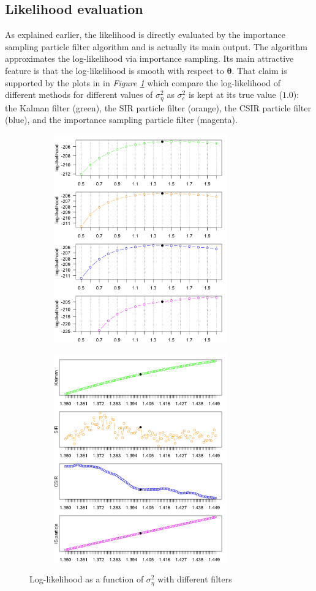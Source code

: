 \documentclass[11pt, oneside]{scrreprt}   	%
\begin{document}
\subsection{Likelihood evaluation}
As explained earlier, the likelihood is directly evaluated by the importance sampling particle filter algorithm and is actually its main output. 
The algorithm approximates the log-likelihood via importance sampling. 
Its main attractive feature is that the log-likelihood is smooth with respect to $\boldsymbol{\theta}$. 
That claim is supported by the plots in in \textit{Figure \ref{fig:ullm_loglik}} which compare the log-likelihood of different methods for different values of $\sigma_{\eta}^2$ as $\sigma_{\epsilon}^2$ is kept at its true value ($1.0$): the Kalman filter (green), the SIR particle filter (orange), the CSIR particle filter (blue), and the importance sampling particle filter (magenta).\\ 

\begin{figure}[h!]
\centering
\begin{subfigure}{0.5\textwidth}
  \centering
  \includegraphics[width=75mm]{../../images/ullm-loglik-eta.png}
\end{subfigure}%
\begin{subfigure}{0.5\textwidth}
  \centering
  \includegraphics[width=75mm]{../../images/ullm-loglik-zoom.png}
\end{subfigure}
\caption{Log-likelihood as a function of $\sigma_{\eta}^2$ with different filters}
\label{fig:ullm_loglik}
\end{figure}
\end{document}
